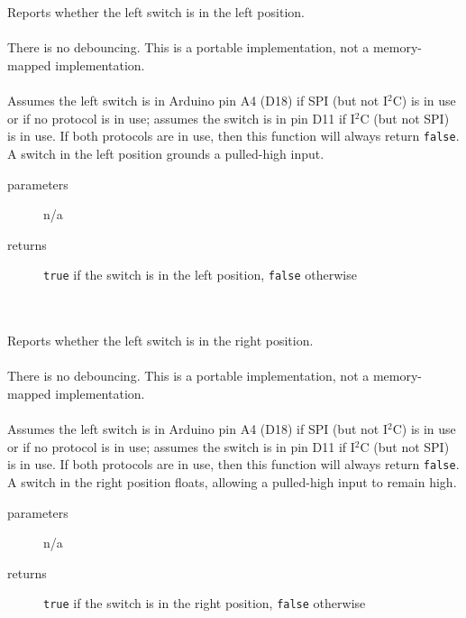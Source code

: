 \begin{itemize}
         \\ \\
        Reports whether the left switch is in the left position. \\ \\
            There is no debouncing.
            This is a portable implementation, not a memory-mapped implementation. \\ \\
            Assumes the left switch is in Arduino pin A4 (D18) if SPI (but not I$^2$C) is in use or if no protocol is in use;
            assumes the switch is in pin D11 if I$^2$C (but not SPI) is in use.
            If both protocols are in use, then this function will always return \lstinline{false}.
            A switch in the left position grounds a pulled-high input.
            \begin{description}
                \item[parameters] n/a
                \item[returns] \lstinline{true} if the switch is in the left position, \lstinline{false} otherwise
            \end{description}

         \\ \\
        Reports whether the left switch is in the right position. \\ \\
        There is no debouncing.
        This is a portable implementation, not a memory-mapped implementation. \\ \\
        Assumes the left switch is in Arduino pin A4 (D18) if SPI (but not I$^2$C) is in use or if no protocol is in use;
        assumes the switch is in pin D11 if I$^2$C (but not SPI) is in use.
        If both protocols are in use, then this function will always return \lstinline{false}.
        A switch in the right position floats, allowing a pulled-high input to remain high.
        \begin{description}
            \item[parameters] n/a
            \item[returns] \lstinline{true} if the switch is in the right position, \lstinline{false} otherwise
        \end{description}


\end{itemize}
